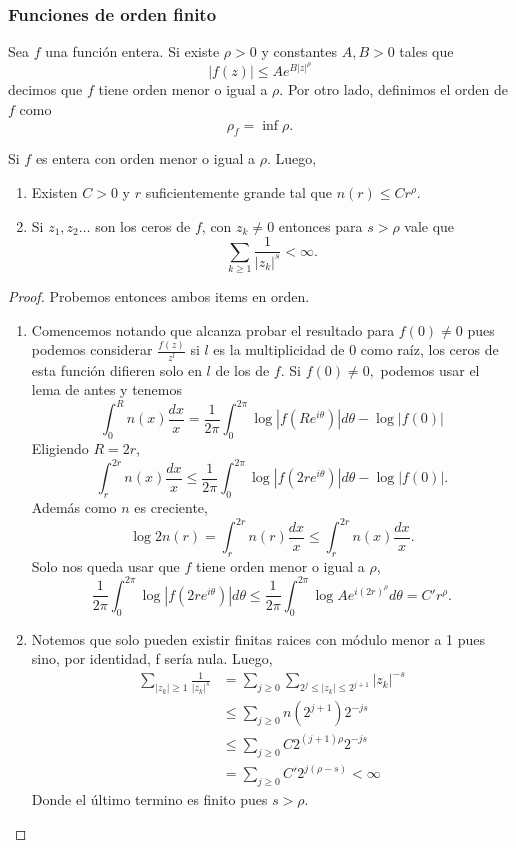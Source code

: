 \documentclass[
]{kaohandt}
\begin{document}
	\subsubsection{Funciones de orden finito}
		
	Sea $f$ una función entera. Si existe $\rho > 0$ y constantes $A, B > 0$ tales que 
	$$ |f(z)| \leq Ae^{B|z|^\rho}$$
	decimos que $f$ tiene orden menor o igual a $\rho.$ Por otro lado, definimos el orden de $f$ como 
	$$\rho_f = \inf{\rho}.$$
	
	\begin{theorem}
		Si $f$ es entera con orden menor o igual a $\rho$. Luego,
		\begin{enumerate}
			\item Existen $C > 0$ y $r$ suficientemente grande tal que $n(r) \leq Cr^{\rho}.$
			\item Si $z_1, z_2 \dots$ son los ceros de $f$, con $z_k \neq 0$ entonces para $s > \rho$ vale que 
			$$ \sum_{k\geq1} \frac{1}{|z_k|^{s}} < \infty.$$
		\end{enumerate}
	\end{theorem}  
	
	\begin{proof}
		
		Probemos entonces ambos items en orden.
		
		\begin{enumerate}
			\item Comencemos notando que alcanza probar el resultado para $f(0) \neq 0$ pues podemos considerar $\frac{f(z)}{z^{l}}$ si $l$ es la multiplicidad de $0$ como raíz, los ceros de esta función difieren solo en $l$ de los de $f$. Si $f(0) \neq 0,$ podemos usar el lema de antes y tenemos
			$$\int_{0}^{R} n(x)\frac{dx}{x} = \frac{1}{2\pi} \int_{0}^{2\pi} \log{|f(Re^{i\theta})|}d\theta - \log{|f(0)|}$$
			Eligiendo $R = 2r$,
			$$\int_{r}^{2r} n(x)\frac{dx}{x} \leq \frac{1}{2\pi} \int_{0}^{2\pi} \log{|f(2re^{i\theta})|}d\theta - \log{|f(0)|}.$$
			Además como $n$ es creciente, 
			$$ \log{2}n(r) = \int_{r}^{2r} n(r) \frac{dx}{x} \leq \int_{r}^{2r} n(x)\frac{dx}{x}.$$
			Solo nos queda usar que $f$ tiene orden menor o igual a $\rho$,
			$$\frac{1}{2\pi} \int_{0}^{2\pi} \log{|f(2re^{i\theta})|}d\theta \leq \frac{1}{2\pi} \int_{0}^{2\pi} \log{Ae^{i(2r)^{\rho}}}d\theta = C'r^{\rho}.$$
			
			\item Notemos que solo pueden existir finitas raices con módulo menor a 1 pues sino, por identidad, f sería nula. Luego,
			\[
			\begin{aligned}
			\sum_{|z_k|\geq1} \frac{1}{|z_k|^{s}} &= \sum_{j\geq 0} \sum_{2^{j} \leq |z_k| \leq 2^{j+1}} |z_k|^{-s} \\
			&\leq \sum_{j\geq 0} n(2^{j+1})2^{-js} \\
			&\leq \sum_{j\geq 0} C2^{(j+1)\rho}2^{-js} \\
			&= \sum_{j\geq 0} C'2^{j(\rho - s)} < \infty
			\end{aligned} 
			\]
			Donde el último termino es finito pues $s > \rho.$
		\end{enumerate}
	\end{proof}
	
\end{document}
